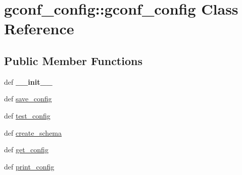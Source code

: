 \hypertarget{classgconf__config_1_1gconf__config}{
\section{gconf\_\-config::gconf\_\-config Class Reference}
\label{classgconf__config_1_1gconf__config}
}
\subsection*{Public Member Functions}
\begin{DoxyCompactItemize}
\item 
\hypertarget{classgconf__config_1_1gconf__config_a424094e53dc68f6e166a5021d7440691}{
def {\bfseries \_\-\_\-init\_\-\_\-}}
\label{classgconf__config_1_1gconf__config_a424094e53dc68f6e166a5021d7440691}

\item 
def \hyperlink{classgconf__config_1_1gconf__config_a38d2a663a02556194c1015150d1a2f74}{save\_\-config}
\item 
def \hyperlink{classgconf__config_1_1gconf__config_af2adddcd62ea4372a5d3222689b38bbd}{test\_\-config}
\item 
def \hyperlink{classgconf__config_1_1gconf__config_aec0b077ae0efcf436aa0f4858b12cbee}{create\_\-schema}
\item 
def \hyperlink{classgconf__config_1_1gconf__config_aea7ff2ce8c9dee3322e6f28d957addef}{get\_\-config}
\item 
def \hyperlink{classgconf__config_1_1gconf__config_aec8448d5f80c97a04be794cea5cfb3ad}{print\_\-config}
\end{DoxyCompactItemize}
